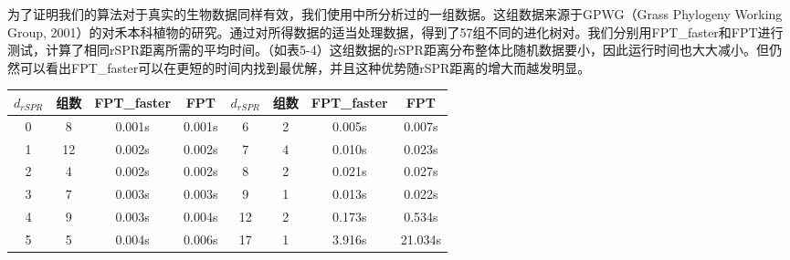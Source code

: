 为了证明我们的算法对于真实的生物数据同样有效，我们使用\cite{wu2009practical}中所分析过的一组数据。这组数据来源于GPWG（Grass Phylogeny Working Group, 2001）的对禾本科植物的研究。通过对所得数据的适当处理数据，得到了57组不同的进化树对。我们分别用FPT\_faster和FPT进行测试，计算了相同rSPR距离所需的平均时间。（如表5-4）这组数据的rSPR距离分布整体比随机数据要小，因此运行时间也大大减小。但仍然可以看出FPT\_faster可以在更短的时间内找到最优解，并且这种优势随rSPR距离的增大而越发明显。

\begin{center}
\begin{tabular}{ c c c c | c c c c}
  \hline
    $d_{rSPR}$ & 组数 & FPT\_faster & FPT & $d_{rSPR}$ & 组数 & FPT\_faster & FPT \\ \hline
    0 & 8 & 0.001s & 0.001s & 6 & 2 & 0.005s & 0.007s \\
    1 & 12 & 0.002s & 0.002s & 7 & 4 & 0.010s & 0.023s \\
    2 & 4 & 0.002s & 0.002s & 8 & 2 & 0.021s & 0.027s \\
    3 & 7 & 0.003s & 0.003s & 9 & 1 & 0.013s & 0.022s \\
    4 & 9 & 0.003s & 0.004s & 12 & 2 & 0.173s & 0.534s \\
    5 & 5 & 0.004s & 0.006s & 17 & 1 & 3.916s & 21.034s \\
  \hline
\end{tabular}
\end{center}





















